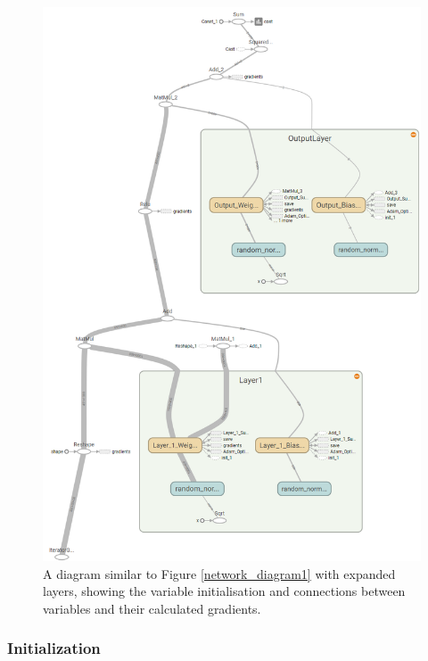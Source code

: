 \documentclass[a4paper,11pt,notitlepage]{article}
\begin{document}
\begin{figure}[H]
	\centering
	\vspace{0.5cm}
	\includegraphics[scale = 0.5]{figs/network_diagram3.png}
	\caption{A diagram similar to Figure \ref{network_diagram1} with expanded layers, showing the variable initialisation and connections between variables and their calculated gradients.}
	\label{network_diagram2}
\end{figure}

\newpage
\subsubsection{Initialization}
\end{document}

